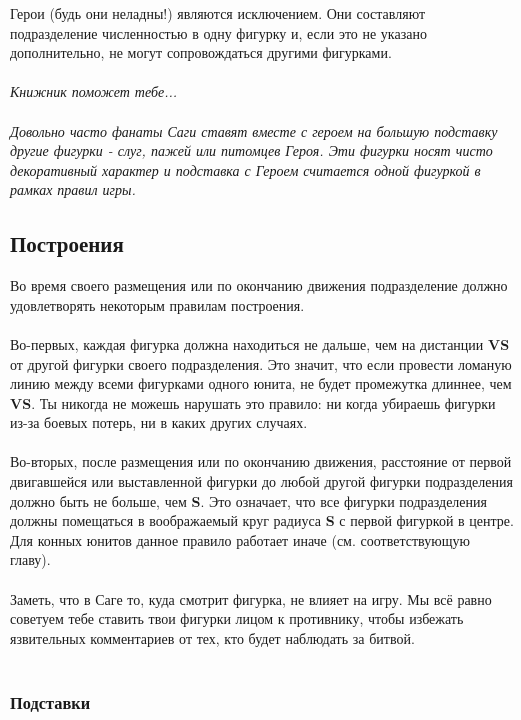 \documentclass[a4paper,11pt,twoside]{article}
\begin{document}
Герои (будь они неладны!) являются исключением. Они составляют подразделение численностью в одну фигурку и, если это не указано дополнительно, не могут сопровождаться другими фигурками. \\ \\ 

\begingroup
\fontsize{15pt}{11pt}\selectfont
\textit{Книжник поможет тебе...}\\ \\
\fontsize{11pt}{11pt}\selectfont
\textit{Довольно часто фанаты Саги ставят вместе с героем на большую подставку другие фигурки - слуг, пажей или питомцев Героя. Эти фигурки носят чисто декоративный характер и подставка с Героем считается одной фигуркой в рамках правил игры.}
\endgroup 

\subsection*{Построения}

Во время своего размещения или по окончанию движения подразделение должно удовлетворять некоторым правилам построения. \\ \\
Во-первых, каждая фигурка должна находиться не дальше, чем на дистанции \textbf{VS} от другой фигурки своего подразделения. Это значит, что если провести ломаную линию между всеми фигурками одного юнита, не будет промежутка длиннее, чем \textbf{VS}. Ты никогда не можешь нарушать это правило: ни когда убираешь фигурки из-за боевых потерь, ни в каких других случаях. \\ \\ 
Во-вторых, после размещения или по окончанию движения, расстояние от первой двигавшейся или выставленной фигурки до любой другой фигурки подразделения должно быть не больше, чем \textbf{S}. Это означает, что все фигурки подразделения должны помещаться в воображаемый круг радиуса \textbf{S} с первой фигуркой в центре. Для конных юнитов данное правило работает иначе (см. соответствующую главу). \\ \\
Заметь, что в Саге то, куда смотрит фигурка, не влияет на игру. Мы всё равно советуем тебе ставить твои фигурки лицом к противнику, чтобы избежать язвительных комментариев от тех, кто будет наблюдать за битвой. \\ \\ 

\subsubsection*{Подставки}
\end{document}
